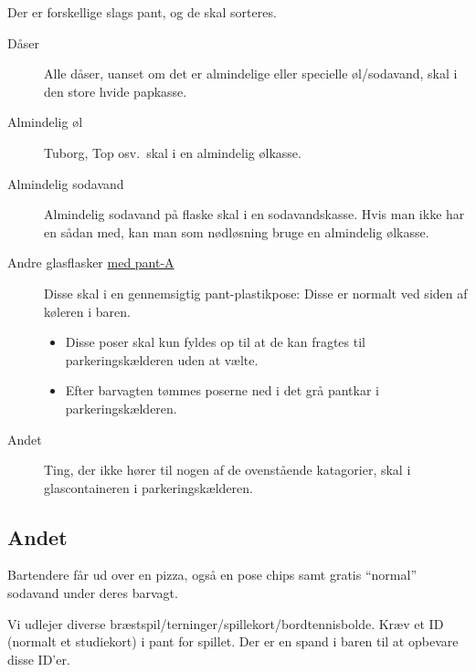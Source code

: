Der er forskellige slags pant, og de skal sorteres.
\begin{description}
\item[Dåser] Alle dåser, uanset om det er almindelige eller specielle
  øl/sodavand, skal i den store hvide papkasse.
\item[Almindelig øl] Tuborg, Top osv.\ skal i en almindelig ølkasse.
\item[Almindelig sodavand] Almindelig sodavand på flaske skal i en
  sodavandskasse. Hvis man ikke har en sådan med, kan man som
  nødløsning bruge en almindelig ølkasse.%
\item[Andre glasflasker \underline{med pant-A}] Disse skal i en gennemsigtig
  pant-plastikpose: Disse er normalt ved siden af køleren i baren.
  \begin{itemize}
    \item Disse poser skal kun fyldes op til at de kan fragtes til parkeringskælderen uden at vælte.
    \item Efter barvagten tømmes poserne ned i det grå pantkar i parkeringskælderen.
  \end{itemize}
\item[Andet] Ting, der ikke hører til nogen af de ovenstående
  katagorier, skal i glascontaineren i parkeringskælderen.
\end{description}

\iffalse
Hvis man i slutningen af vagten har ryddet det meste væk, men så
opdager en pant-A-flaske/dåse el.lign.\ kan denne godt puttes i den
gennemsigtige/hvide plastkasse. Dog jo mere, der puttes i denne, desto
mere skal pantvagten manuelt pante, så prøv at begrænse det.
\fi

\subsection{Andet}
\label{sec:intra:andet}

Bartendere får ud over en pizza, også en pose chips samt gratis
``normal'' sodavand under deres barvagt.

Vi udlejer diverse
bræstspil/terninger/spillekort/bordtennisbolde. Kræv et ID (normalt et
studiekort) i pant for spillet. Der er en spand i baren til at
opbevare disse ID'er.


